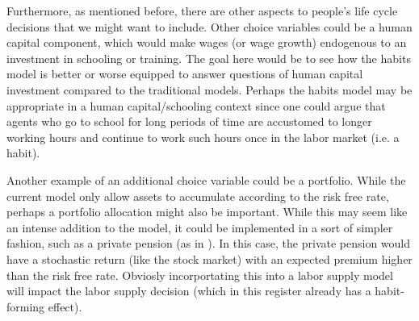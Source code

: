 \documentclass[ProjectMMD]{subfiles}
\begin{document}
Furthermore, as mentioned before, there are other aspects to people's life cycle decisions that we might want to include. Other choice variables could be a human capital component, which would make wages (or wage growth) endogenous to an investment in schooling or training. The goal here would be to see how the habits model is better or worse equipped to answer questions of human capital investment compared to the traditional models. Perhaps the habits model may be appropriate in a human capital/schooling context since one could argue that agents who go to school for long periods of time are accustomed to longer working hours and continue to work such hours once in the labor market (i.e. a habit).

Another example of an additional choice variable could be a portfolio. While the current model only allow assets to accumulate according to the risk free rate, perhaps a portfolio allocation might also be important. While this may seem like an intense addition to the model, it could be implemented in a sort of simpler fashion, such as a private pension (as in \cite{keane2016labour}). In this case, the private pension would have a stochastic return (like the stock market) with an expected premium higher than the risk free rate. Obviosly incorportating this into a labor supply model will impact the labor supply decision (which in this register already has a habit-forming effect).






\onlyinsubfile{}
%
\end{document}
